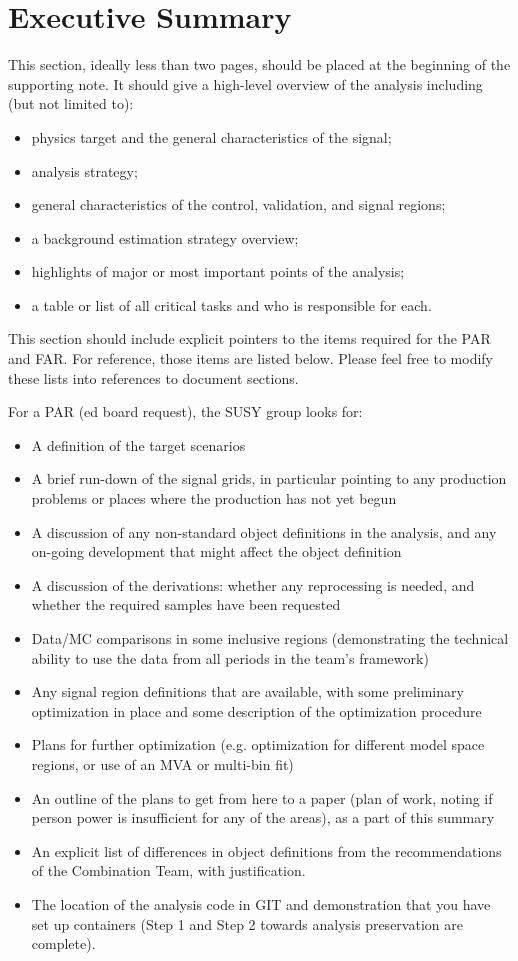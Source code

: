 \section{Executive Summary}

This section, ideally less than two pages, should be placed at the beginning of the supporting note.
It should give a high-level overview of the analysis including (but not limited to):
\begin{itemize}
\item physics target and the general characteristics of the signal;
\item analysis strategy;
\item general characteristics of the control, validation, and signal regions;
\item a background estimation strategy overview;
\item highlights of major or most important points of the analysis;
\item a table or list of all critical tasks and who is responsible for each.
\end{itemize}

This section should include explicit pointers to the items required for the PAR and FAR.  For reference, those items are listed below. Please feel free to modify these lists into references to document sections.

For a PAR (ed board request), the SUSY group looks for:
\begin{itemize}
\item A definition of the target scenarios
\item A brief run-down of the signal grids, in particular pointing to any production problems or places where the production has not yet begun
\item A discussion of any non-standard object definitions in the analysis, and any on-going development that might affect the object definition
\item A discussion of the derivations: whether any reprocessing is needed, and whether the required samples have been requested
\item Data/MC comparisons in some inclusive regions (demonstrating the technical ability to use the data from all periods in the team's framework)
\item Any signal region definitions that are available, with some preliminary optimization in place and some description of the optimization procedure
\item Plans for further optimization (e.g. optimization for different model space regions, or use of an MVA or multi-bin fit)
\item An outline of the plans to get from here to a paper (plan of work, noting if person power is insufficient for any of the areas), as a part of this summary
\item An explicit list of differences in object definitions from the recommendations of the Combination Team, with justification.
\item The location of the analysis code in GIT and demonstration that you have set up containers (Step 1 and Step 2 towards analysis preservation are complete).
\end{itemize}

